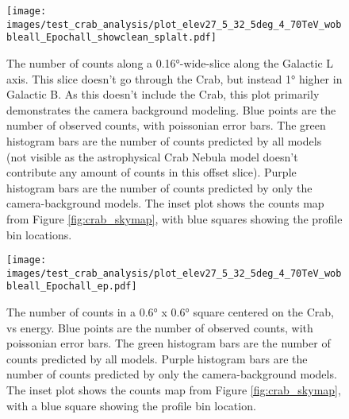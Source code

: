   \begin{figure}[h]
    \centering
    \texttt{[image: images/test\_crab\_analysis/plot\_elev27\_5\_32\_5deg\_4\_70TeV\_wobbleall\_Epochall\_showclean\_splalt.pdf]}
    \caption[Crab Profile along Galactic L Off Source]
    {
      The number of counts along a \ang{0.16}-wide-slice along the Galactic L axis.
      This slice doesn't go through the Crab, but instead \ang{1} higher in Galactic B.
      As this doesn't include the Crab, this plot primarily demonstrates the camera background modeling.
      Blue points are the number of observed counts, with poissonian error bars.
      The green histogram bars are the number of counts predicted by all models (not visible as the astrophysical Crab Nebula model doesn't contribute any amount of counts in this offset slice).
      Purple histogram bars are the number of counts predicted by only the camera-background models.
      The inset plot shows the counts map from Figure \ref{fig:crab_skymap}, with blue squares showing the profile bin locations.
    }
    \label{fig:crab_profile_l_off}
  \end{figure}

  \begin{figure}[h]
    \centering
    \texttt{[image: images/test\_crab\_analysis/plot\_elev27\_5\_32\_5deg\_4\_70TeV\_wobbleall\_Epochall\_ep.pdf]}
    \caption[Crab Profile in Energy]
    {
      The number of counts in a \ang{0.6} x \ang{0.6} square centered on the Crab, vs energy.
      Blue points are the number of observed counts, with poissonian error bars.
      The green histogram bars are the number of counts predicted by all models.
      Purple histogram bars are the number of counts predicted by only the camera-background models.
      The inset plot shows the counts map from Figure \ref{fig:crab_skymap}, with a blue square showing the profile bin location.
    }
    \label{fig:crab_profile_energy}
  \end{figure}
    
